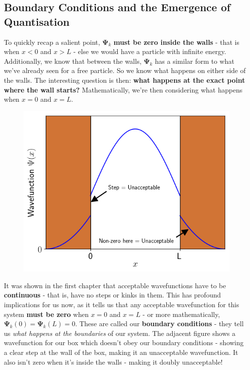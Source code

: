 \documentclass{memoir}[11pt,oneside,a4paper,openany]
\newcommand{\wf}{\ensuremath{\bm{\Psi}}\xspace}
\begin{document}
\subsection{Boundary Conditions and the Emergence of Quantisation}
To quickly recap a salient point, $\wf_k$ \textbf{must be zero inside the walls} - that is when $x<0$ and $x>L$ - else we would have a particle with infinite energy. Additionally, we know that between the walls, $\wf_k$ has a similar form to what we've already seen for a free particle. So we know what happens on either side of the walls. The interesting question is then: \textbf{what happens at the exact point where the wall starts?} Mathematically, we're then considering what happens when $x=0$ and $x=L$. 

\begin{figure}
	\includegraphics[width=\linewidth]{particle_box_wf_unacceptable.png}
\end{figure}
It was shown in the first chapter that acceptable wavefunctions have to be \textbf{continuous} - that is, have no steps or kinks in them. This has profound implications for us now, as it tells us that any acceptable wavefunction for this system \textbf{must be zero} when $x=0$ and $x=L$ - or more mathematically, $\wf_k(0) = \wf_k(L) = 0$. These are called our \textbf{boundary conditions} - they tell us \emph{what happens at the boundaries} of our system. The adjacent figure shows a wavefunction for our box which doesn't obey our boundary conditions - showing a clear step at the wall of the box, making it an unacceptable wavefunction. It also isn't zero when it's inside the walls - making it doubly unacceptable!
\end{document}
